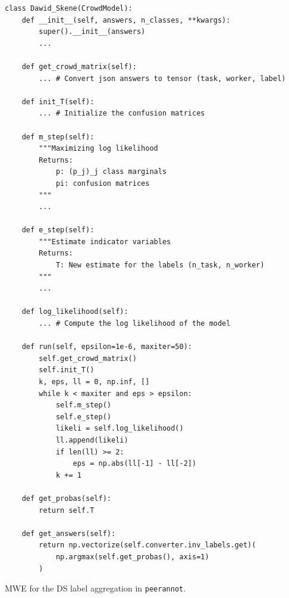 \begin{listing}[ht]
    \begin{verbatim}
class Dawid_Skene(CrowdModel):
    def __init__(self, answers, n_classes, **kwargs):
        super().__init__(answers)
        ...

    def get_crowd_matrix(self):
        ... # Convert json answers to tensor (task, worker, label)

    def init_T(self):
        ... # Initialize the confusion matrices

    def m_step(self):
        """Maximizing log likelihood
        Returns:
            p: (p_j)_j class marginals
            pi: confusion matrices
        """
        ...

    def e_step(self):
        """Estimate indicator variables
        Returns:
            T: New estimate for the labels (n_task, n_worker)
        """
        ...

    def log_likelihood(self):
        ... # Compute the log likelihood of the model

    def run(self, epsilon=1e-6, maxiter=50):
        self.get_crowd_matrix()
        self.init_T()
        k, eps, ll = 0, np.inf, []
        while k < maxiter and eps > epsilon:
            self.m_step()
            self.e_step()
            likeli = self.log_likelihood()
            ll.append(likeli)
            if len(ll) >= 2:
                eps = np.abs(ll[-1] - ll[-2])
            k += 1

    def get_probas(self):
        return self.T

    def get_answers(self):
        return np.vectorize(self.converter.inv_labels.get)(
            np.argmax(self.get_probas(), axis=1)
        )
\end{verbatim}
\caption{MWE for the DS label aggregation in \texttt{peerannot}.}
\label{listing:DS}
\end{listing}
